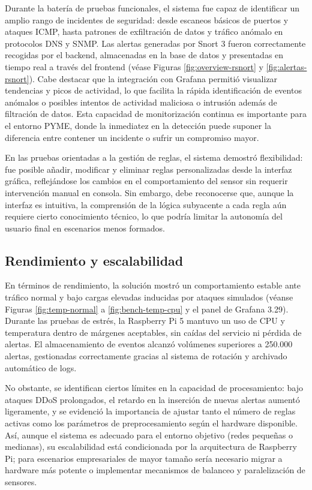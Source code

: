 \documentclass[11pt,a4paper,twoside]{report}
\begin{document}
Durante la batería de pruebas funcionales, el sistema fue capaz de identificar un amplio rango de incidentes de seguridad: desde escaneos básicos de puertos y ataques ICMP, hasta patrones de exfiltración de datos y tráfico anómalo en protocolos DNS y SNMP. Las alertas generadas por Snort 3 fueron correctamente recogidas por el backend, almacenadas en la base de datos y presentadas en tiempo real a través del frontend (véase Figuras \ref{fig:overview-rsnort} y \ref{fig:alertas-rsnort}). Cabe destacar que la integración con Grafana permitió visualizar tendencias y picos de actividad, lo que facilita la rápida identificación de eventos anómalos o posibles intentos de actividad maliciosa o intrusión además de filtración de datos. Esta capacidad de monitorización continua es importante para el entorno PYME, donde la inmediatez en la detección puede suponer la diferencia entre contener un incidente o sufrir un compromiso mayor.\newline

En las pruebas orientadas a la gestión de reglas, el sistema demostró flexibilidad: fue posible añadir, modificar y eliminar reglas personalizadas desde la interfaz gráfica, reflejándose los cambios en el comportamiento del sensor sin requerir intervención manual en consola. Sin embargo, debe reconocerse que, aunque la interfaz es intuitiva, la comprensión de la lógica subyacente a cada regla aún requiere cierto conocimiento técnico, lo que podría limitar la autonomía del usuario final en escenarios menos formados.

\subsection{Rendimiento y escalabilidad}

En términos de rendimiento, la solución mostró un comportamiento estable ante tráfico normal y bajo cargas elevadas inducidas por ataques simulados (véanse Figuras \ref{fig:temp-normal} a \ref{fig:bench-temp-cpu} y el panel de Grafana 3.29). Durante las pruebas de estrés, la Raspberry Pi 5 mantuvo un uso de CPU y temperatura dentro de márgenes aceptables, sin caídas del servicio ni pérdida de alertas. El almacenamiento de eventos alcanzó volúmenes superiores a 250.000 alertas, gestionadas correctamente gracias al sistema de rotación y archivado automático de logs.\newline

No obstante, se identifican ciertos límites en la capacidad de procesamiento: bajo ataques DDoS prolongados, el retardo en la inserción de nuevas alertas aumentó ligeramente, y se evidenció la importancia de ajustar tanto el número de reglas activas como los parámetros de preprocesamiento según el hardware disponible. Así, aunque el sistema es adecuado para el entorno objetivo (redes pequeñas o medianas), su escalabilidad está condicionada por la arquitectura de Raspberry Pi; para escenarios empresariales de mayor tamaño sería necesario migrar a hardware más potente o implementar mecanismos de balanceo y paralelización de sensores.
\end{document}
